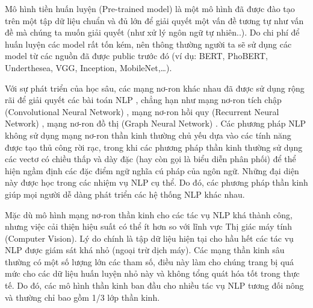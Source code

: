 \documentclass[10pt]{elsarticle}
\begin{document}
Mô hình tiền huấn luyện (Pre-trained model) là một mô hình đã được đào tạo trên một tập dữ liệu chuẩn và đủ lớn để giải quyết một vấn đề tương tự như vấn đề mà chúng ta muốn giải quyết (như xử lý ngôn ngữ tự nhiên..). Do chi phí để huấn luyện các model rất tốn kém, nên thông thường người ta sẽ sử dụng các model từ các nguồn đã được public trước đó (ví dụ: BERT, PhoBERT, Underthesea, VGG, Inception, MobileNet,…).

Với sự phát triển của học sâu, các mạng nơ-ron khác nhau đã được sử dụng rộng rãi để giải quyết các bài toán NLP , chẳng hạn như mạng nơ-ron tích chập (Convolutional Neural Network) \citep{gehring2017convolutional, kalchbrenner-etal-2014-convolutional, kim-2014-convolutional}, mạng nơ-ron hồi quy (Recurrent Neural Network) \citep{sutskever-2014-sequence, liu-2016-recurrent}, mạng nơ-ron đồ thị (Graph Neural Network) \citep{socher-2013-recursivedeep, tai2015improved, marcheggiani2018exploiting}. Các phương pháp NLP không sử dụng mạng nơ-ron thần kinh thường chủ yếu dựa vào các tính năng được tạo thủ công rời rạc, trong khi các phương pháp thần kinh thường sử dụng các vectơ có chiều thấp và dày đặc (hay còn gọi là biểu diễn phân phối) để thể hiện ngầm định các đặc điểm ngữ nghĩa cú pháp của ngôn ngữ. Những đại diện này được học trong các nhiệm vụ NLP cụ thể. Do đó, các phương pháp thần kinh giúp mọi người dễ dàng phát triển các hệ thống NLP khác nhau.

Mặc dù mô hình mạng nơ-ron thần kinh cho các tác vụ NLP khá thành công, nhưng việc cải thiện hiệu suất có thể ít hơn so với lĩnh vực Thị giác máy tính (Computer Vision). Lý do chính là tập dữ liệu hiện tại cho hầu hết các tác vụ NLP được giám sát khá nhỏ (ngoại trừ dịch máy). Các mạng thần kinh sâu thường có một số lượng lớn các tham số, điều này làm cho chúng trang bị quá mức cho các dữ liệu huấn luyện nhỏ này và không tổng quát hóa tốt trong thực tế. Do đó, các mô hình thần kinh ban đầu cho nhiều tác vụ NLP tương đối nông và thường chỉ bao gồm 1/3 lớp thần kinh.
\end{document}
